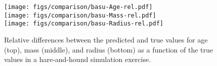 \documentclass[twocolumn,twocolappendix]{aastex6}
\newcommand{\colwidth}{\linewidth}
\begin{document}
\begin{figure}
    \centering
    \texttt{[image: figs/comparison/basu-Age-rel.pdf]}\\
    \texttt{[image: figs/comparison/basu-Mass-rel.pdf]}\\
    \texttt{[image: figs/comparison/basu-Radius-rel.pdf]}
    \caption{Relative differences between the predicted and true values for age (top), mass (middle), and radius (bottom) as a function of the true values in a hare-and-hound simulation exercise. \vspace*{5mm} %
    \label{fig:hare-comparison}}
\end{figure}


\end{document}

